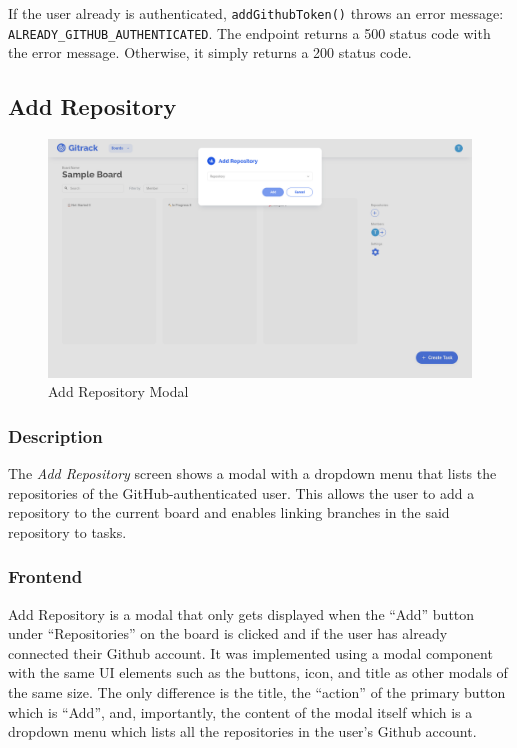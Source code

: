 \documentclass{article}
\def\code#1{\texttt{#1}}
\begin{document}
If the user already is authenticated, \code{addGithubToken()} throws an error
message: \code{ALREADY\_GITHUB\_AUTHENTICATED}. The endpoint returns a 500
status code with the error message. Otherwise, it simply returns a 200 status
code.

\subsection{Add Repository}
\begin{figure}[H]
	\includegraphics[width=1\textwidth]{add-repo}\par\vspace{0.5cm}
	\caption{Add Repository Modal}
	\label{fig:add-repo}
\end{figure}

\subsubsection{Description}
The \emph{Add Repository} screen shows a modal with a dropdown menu that lists
the repositories of the GitHub-authenticated user. This allows the user to add a
repository to the current board and enables linking branches in the said
repository to tasks.

\subsubsection{Frontend}
Add Repository is a modal that only gets displayed when the ``Add'' button under
``Repositories'' on the board is clicked and if the user has already connected
their Github account. It was implemented using a modal component with the same
UI elements such as the buttons, icon, and title as other modals of the same
size. The only difference is the title, the ``action'' of the primary button
which is ``Add'', and, importantly, the content of the modal itself which is a
dropdown menu which lists all the repositories in the user’s Github account.
\end{document}
